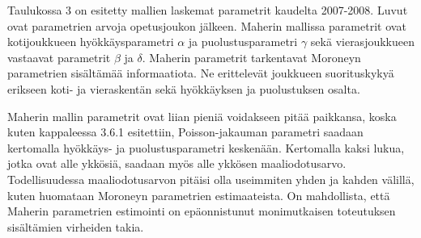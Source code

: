 \documentclass[a4paper,finnish,titlepage,12pt]{article}
\begin{document}
Taulukossa 3 on esitetty mallien laskemat parametrit kaudelta 2007-2008. Luvut ovat parametrien arvoja opetusjoukon jälkeen.
Maherin mallissa parametrit ovat kotijoukkueen hyökkäysparametri $\alpha$ ja puolustusparametri $\gamma$ sekä vierasjoukkueen vastaavat parametrit $\beta$ ja $\delta$.
Maherin parametrit tarkentavat Moroneyn parametrien sisältämää informaatiota. Ne erittelevät joukkueen suorituskykyä erikseen koti- ja vieraskentän sekä hyökkäyksen ja puolustuksen osalta.

Maherin mallin parametrit ovat liian pieniä voidakseen pitää paikkansa, koska kuten kappaleessa 3.6.1 esitettiin, Poisson-jakauman parametri saadaan kertomalla hyökkäys- ja puolustusparametri keskenään. Kertomalla kaksi lukua, jotka ovat alle ykkösiä, saadaan myös alle ykkösen maaliodotusarvo. Todellisuudessa maaliodotusarvon pitäisi olla useimmiten yhden ja kahden välillä, kuten huomataan Moroneyn parametrien estimaateista.
On mahdollista, että Maherin parametrien estimointi on epäonnistunut monimutkaisen toteutuksen sisältämien virheiden takia.
\end{document}
